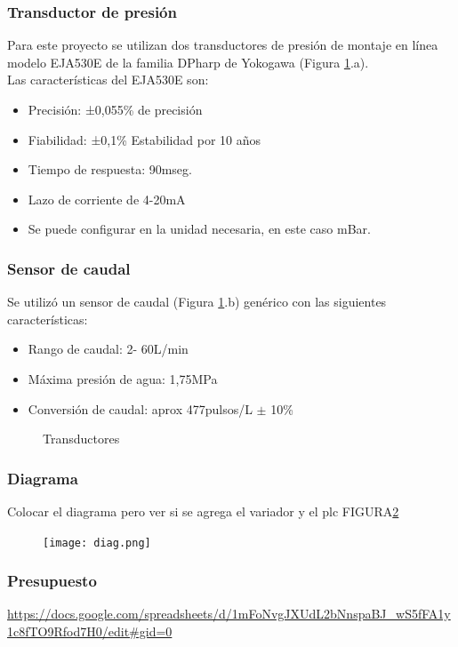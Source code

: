 \subsubsection{Transductor de presión}
Para este proyecto se utilizan dos transductores de presión de montaje en línea modelo EJA530E de la familia  DPharp de Yokogawa (Figura \ref{fig:transd}.a).\\
Las características del EJA530E son:
\begin{itemize}
	\item Precisión: ±0,055\% de precisión
	\item Fiabilidad: ±0,1\% Estabilidad por 10 años
	\item Tiempo de respuesta: 90mseg.
	\item Lazo de corriente de 4-20mA
	\item Se puede configurar en la unidad necesaria, en este caso mBar.
\end{itemize}


\subsubsection{Sensor de caudal}
Se utilizó un sensor de caudal (Figura \ref{fig:transd}.b) genérico con las siguientes características:
\begin{itemize}
	\item Rango de caudal: 2- 60L/min
	\item Máxima presión de agua: 1,75MPa
	\item Conversión de caudal: aprox 477pulsos/L $\pm$ 10\%
\end{itemize}


\begin{figure}[htbp]
	\centering
	\caption{Transductores} \label{fig:transd}
\end{figure}





\subsubsection{Diagrama}
Colocar el diagrama  pero ver si se agrega el variador y el plc FIGURA\ref{fig:diag}

\begin{figure}[htb]
	\centering
	\texttt{[image: diag.png]}
	\label{fig:diag}
\end{figure}

\subsubsection{Presupuesto}
\url{https://docs.google.com/spreadsheets/d/1mFoNvgJXUdL2bNnspaBJ_wS5fFA1y1c8fTO9Rfod7H0/edit#gid=0}

\newpage